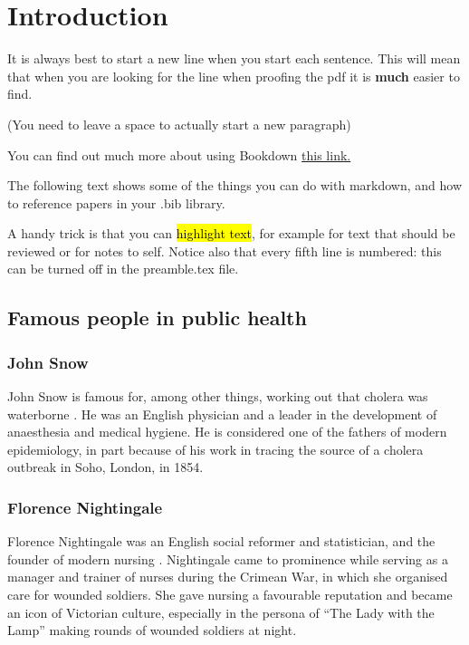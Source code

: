 \documentclass[12pt,]{book}
\begin{document}
\pagebreak

\tableofcontents
\listoftables 
\listoffigures
\doublespacing

\hypertarget{intro}{%
\chapter{Introduction}\label{intro}}

It is always best to start a new line when you start each sentence.
This will mean that when you are looking for the line when proofing the pdf it is \textbf{much} easier to find.

(You need to leave a space to actually start a new paragraph)

You can find out much more about using Bookdown \href{https://bookdown.org/yihui/bookdown/}{this link.}

The following text shows some of the things you can do with markdown, and how to reference papers in your .bib library.

A handy trick is that you can \hl{highlight text}, for example for text that should be reviewed or for notes to self.
Notice also that every fifth line is numbered: this can be turned off in the preamble.tex file.

\hypertarget{famous-people-in-public-health}{%
\section{Famous people in public health}\label{famous-people-in-public-health}}

\hypertarget{john-snow}{%
\subsection{John Snow}\label{john-snow}}

John Snow is famous for, among other things, working out that cholera was waterborne \citep{Snow:1856}.
He was an English physician and a leader in the development of anaesthesia and medical hygiene.
He is considered one of the fathers of modern epidemiology, in part because of his work in tracing the source of a cholera outbreak in Soho, London, in 1854.

\hypertarget{florence-nightingale}{%
\subsection{Florence Nightingale}\label{florence-nightingale}}

Florence Nightingale was an English social reformer and statistician, and the founder of modern nursing \citep{Nightingale:1992}. Nightingale came to prominence while serving as a manager and trainer of nurses during the Crimean War, in which she organised care for wounded soldiers.
She gave nursing a favourable reputation and became an icon of Victorian culture, especially in the persona of ``The Lady with the Lamp'' making rounds of wounded soldiers at night.
\end{document}
